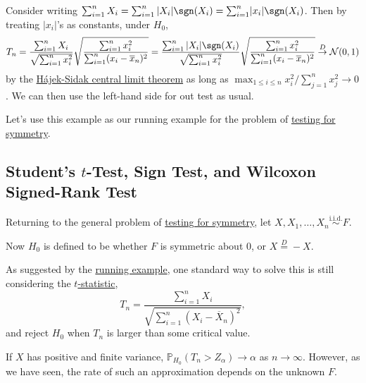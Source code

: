 \begin{eg}\label{eg:two-sample-t-statistic}
	Consider writing \(\sum_{i=1}^{n} X_i = \sum_{i=1}^{n} \vert X_i \vert \sgn (X_i) = \sum_{i=1}^{n} \lvert x_i \rvert \sgn (X_i)\). Then by treating \(\vert x_i \vert \)'s as constants, under \(H_0\),
	\begin{equation}\label{eq:two-sample}
		T_n
		= \frac{\sum_{i=1}^{n} X_i}{\sqrt{\sum_{i=1}^{n} x_i^2} } \sqrt{\frac{\sum_{i=1}^{n} x_i^2}{\sum_{i=1}^{n} (x_i - \overline{x} _n)^2}}
		= \frac{\sum_{i=1}^{n} \vert X_i \vert \sgn (X_i)}{\sqrt{\sum_{i=1}^{n} x_i^2} }\sqrt{\frac{\sum_{i=1}^{n} x_i^2}{\sum_{i=1}^{n} (x_i - \overline{x} _n)^2}}
		\overset{D}{\to} \mathcal{N} (0, 1)
	\end{equation}
	by the \hyperref[thm:Hajek-Sidak-CLT]{Hájek-Sidak central limit theorem} as long as \(\max _{1 \leq i \leq n} x_i^2 / \sum_{j=1}^{n} x_j^2 \to 0\). We can then use the left-hand side for out test as usual.
\end{eg}

Let's use this example as our running example for the problem of \hyperref[prb:testing-symmetry]{testing for symmetry}.

\subsection{Student's \(t\)-Test, Sign Test, and Wilcoxon Signed-Rank Test}
Returning to the general problem of \hyperref[prb:testing-symmetry]{testing for symmetry}, let \(X, X_1, \dots , X_n \overset{\text{i.i.d.} }{\sim } F\).

\begin{prev}
	Now \(H_0\) is defined to be whether \(F\) is symmetric about \(0\), or \(X \overset{D}{=} -X\).
\end{prev}

As suggested by the \hyperref[eg:two-sample-t-statistic]{running example}, one standard way to solve this is still considering the \hyperref[def:t-statistic]{\(t\)-statistic},
\[
	T_n
	= \frac{\sum_{i=1}^{n} X_i}{\sqrt{\sum_{i=1}^{n} (X_i - \overline{X} _n)^2} },
\]
and reject \(H_0\) when \(T_n\) is larger than some critical value.

\begin{prev}
	If \(X\) has positive and finite variance, \(\mathbb{P} _{H_0}(T_n > Z_\alpha ) \to \alpha \) as \(n \to \infty \). However, as we have seen, the rate of such an approximation depends on the unknown \(F\).
\end{prev}

